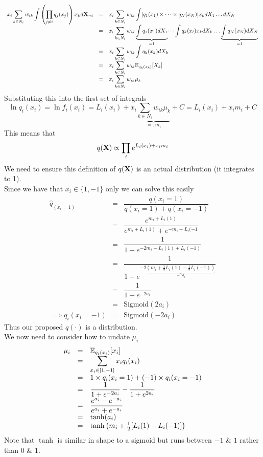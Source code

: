 \documentclass[11pt,a4paper]{article}
\begin{document}
\[\begin{array}{rcl}
{\displaystyle x_i\sum_{k\in N_i}w_{ik}\int\left(\prod_{j\neq i}q_j(x_j)\right)x_kd\textbf{X}_{\neg i}}&=&{\displaystyle x_i\sum_{k\in N_i}w_{ik}\int[q_1(x_1)\times\dots\times q_N(x_N)]x_kdX_1\dots dX_N}\\
&=&{\displaystyle x_i\sum_{k\in N_i}w_{ik}\underbrace{\int q_1(x_1)dX_1}_{=1}\dots\int q_k(x_l)x_kdX_k\dots\underbrace{\int q_N(x_N)dX_N}_{=1}}\\
&=&{\displaystyle x_i\sum_{k\in N_i}w_{ik}\int q_k(x_k)dX_k}\\
&=&{\displaystyle x_i\sum_{k\in N_i}w_{ik}\mathbb{E}_{q_k(x_k)}[X_k]}\\
&=&{\displaystyle x_i\sum_{k\in N_i}w_{ik}\mu_k}
\end{array}\]
Substituting this into the first set of integrals
$$\ln q_i(x_i)=\ln f_i(x_i)=L_i(x_i)+x_i\underbrace{\sum_{k\in N_i}w_{ik}\mu_k}_{=:m_i}+C=L_i(x_i)+x_im_i+C$$
This means that
$$q(\textbf{X})\propto\prod_ie^{L_i(x_i)+x_im_i}$$
We need to ensure this definition of $q(\textbf{X})$ is an actual distribution (\ie it integrates to 1).\\
Since we have that $x_i\in\{1,-1\}$ only we can solve this easily
\[\begin{array}{rcl}
\hat{q}_(x_i=1)&=&\dfrac{q(x_i=1)}{q(x_i=1)+q(x_i=-1)}\\
&=&\dfrac{e^{m_i+L_i(1)}}{e^{m_i+L_i(1)}+e^{-m_i+L_i(-1}}\\
&=&\dfrac{1}{1+e^{-2m_i-L_i(1)+L_i(-1)}}\\
&=&\dfrac{1}{1+e^{-2\underbrace{\left(m_i+\frac{1}{2}L_i(1)-\frac{1}{2}L_i(-1)\right)}_{=:a_i}}}\\
&=&\dfrac{1}{1+e^{-2a_i}}\\
&=&\text{Sigmoid}(2a_i)\\
\implies q_i(x_i=-1)&=&\text{Sigmoid}(-2a_i)
\end{array}\]
Thus our proposed $q(\cdot)$ is a distribution.\\
We now need to consider how to undate $\mu_i$
\[\begin{array}{rcl}
\mu_i&=&\mathbb{E}_{q_i(x_i)}[x_i]\\
&=&{\displaystyle\sum_{x_i\in[1,-1]}x_iq_i(x_i)}\\
&=&1\times q_i(x_i=1)+(-1)\times q_i(x_i=-1)\\
&=&\dfrac{1}{1+e^{-2a_i}}-\dfrac{1}{1+e^{2a_i}}\\
&=&\dfrac{e^{a_i}-e^{-a_i}}{e^{a_i}+e^{-a_i}}\\
&=&\tanh(a_i)\\
&=&\tanh\left(m_i+\frac{1}{2}[L_i(1)-L_i(-1)]\right)
\end{array}\]
Note that $\tanh$ is similar in shape to a sigmoid but runs between $-1$ \& $1$ rather than $0$ \& $1$.\\
\newpage
\setcounter{section}{-1}
\end{document}
